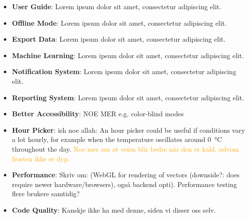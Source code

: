 \begin{itemize}
    \item \textbf{User Guide}: Lorem ipsum dolor sit amet, consectetur adipiscing elit.
    \item \textbf{Offline Mode}: Lorem ipsum dolor sit amet, consectetur adipiscing elit.
    \item \textbf{Export Data}: Lorem ipsum dolor sit amet, consectetur adipiscing elit.
    \item \textbf{Machine Learning}: Lorem ipsum dolor sit amet, consectetur adipiscing elit.
    \item \textbf{Notification System}: Lorem ipsum dolor sit amet, consectetur adipiscing elit.
    \item \textbf{Reporting System}: Lorem ipsum dolor sit amet, consectetur adipiscing elit.
    \item \textbf{Better Accessibility}: NOE MER e.g. color-blind modes
    \item \textbf{Hour Picker}: ish noe allah: An hour picker could be useful if conditions vary a lot hourly, for example when the temperature oscillates around \qty{0}{\celsius} throughout the day. \textcolor{orange}{Noe mer om at veien blir bedre når den er kald, selvom frosten ikke er dyp.}
    \item \textbf{Performance}: Skriv om: (WebGL for rendering of vectors (downside?: does require newer hardware/browsers), også backend opti). Performance testing flere brukere samtidig?
    \item \textbf{Code Quality}: Kanskje ikke ha med denne, siden vi disser oss selv.
\end{itemize}


